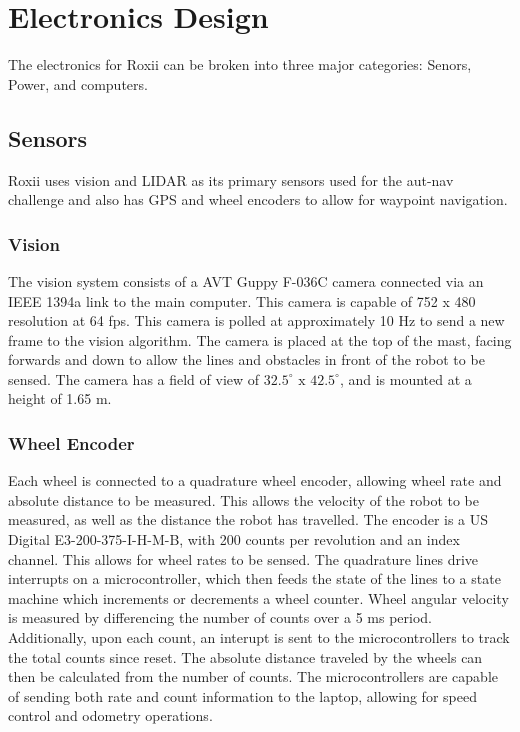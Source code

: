 \section{Electronics Design}

The electronics for Roxii can be broken into three major categories: Senors, Power, and computers.

\subsection{Sensors}

Roxii uses vision and LIDAR as its primary sensors used for the aut-nav challenge and also has GPS and wheel encoders to allow for waypoint navigation.

\subsubsection{Vision}

The vision system consists of a AVT Guppy F-036C camera connected via an IEEE 1394a link to the main computer. This camera is capable of 752 x 480 resolution at 64 fps. This camera is polled at approximately 10 Hz to send a new frame to the vision algorithm.  The camera is placed at the top of the mast, facing forwards and down to allow the lines and obstacles in front of the robot to be sensed. The camera has a field of view of $32.5^{\circ} \text{ x } 42.5^{\circ}$, and is mounted at a height of 1.65 m.

\subsubsection{Wheel Encoder}

Each wheel is connected to a quadrature wheel encoder, allowing wheel rate and absolute distance to be measured. This allows the velocity of the robot to be measured, as well as the distance the robot has travelled. The encoder is a US Digital E3-200-375-I-H-M-B, with 200 counts per revolution and an index channel. This allows for wheel rates to be sensed. The quadrature lines drive interrupts on a microcontroller, which then feeds the state of the lines to a state machine which increments or decrements a wheel counter. Wheel angular velocity is measured by differencing the number of counts over a 5 ms period. Additionally, upon each count, an interupt is sent to the microcontrollers to track the total counts since reset. The absolute distance traveled by the wheels can then be calculated from the number of counts. The microcontrollers are capable of sending both rate and count information to the laptop, allowing for speed control and odometry operations.

